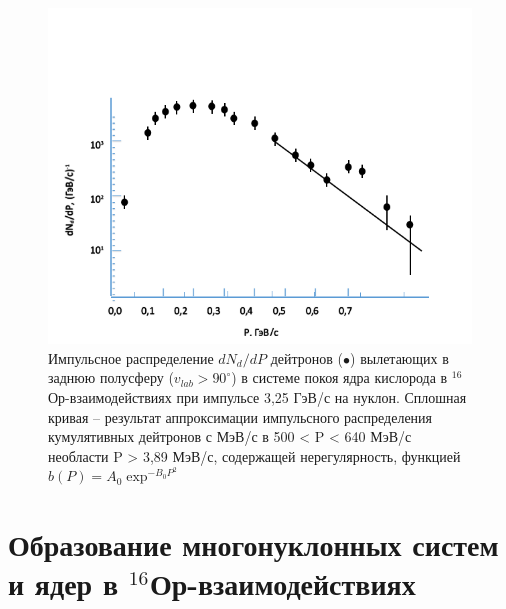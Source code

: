 \documentclass[fontsize=14pt]{scrarticle}
\begin{document}
\begin{figure}[!ht]
\centerline{\includegraphics{picture6.png}}
\caption{Импульсное распределение $dN_{d}/dP$ дейтронов ($\bullet$) вылетающих в заднюю полусферу ($v_{lab}>90^{\circ}$) в системе покоя ядра кислорода в $^{16}$Ор-взаимодействиях при импульсе 3,25 ГэВ/с на нуклон. Сплошная кривая – результат аппроксимации импульсного распределения кумулятивных дейтронов с  МэВ/с в 500 < P < 640 МэВ/с необласти P > 3,89 МэВ/с, содержащей нерегулярность, функцией $b(P) = A_{0}\exp^{-B_{0}P^{2}}$ }
\label{fig6}
\end{figure}

\section{Образование многонуклонных систем и ядер в $^{16}$Ор-взаимодействиях}
\end{document}
